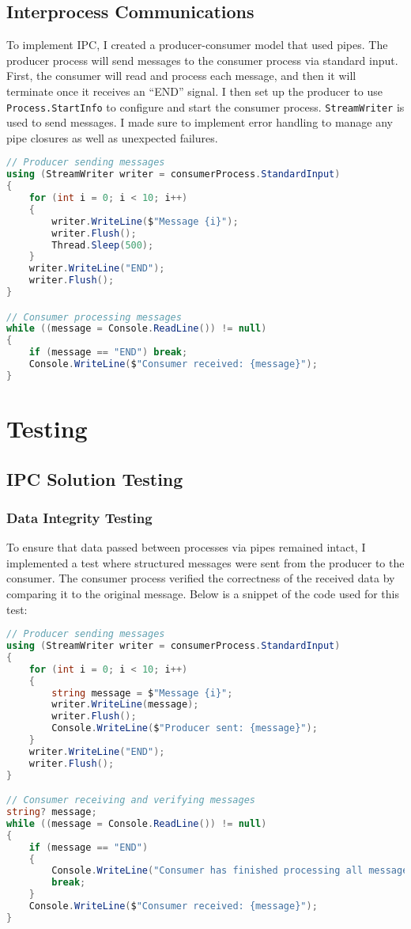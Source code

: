 \documentclass{article}
\begin{document}
\subsection*{Interprocess Communications}

To implement IPC, I created a producer-consumer model that used pipes. The producer process will send messages to the consumer process via standard input. First, the consumer will read and process each message, and then it will terminate once it receives an “END” signal. I then set up the producer to use \texttt{Process.StartInfo} to configure and start the consumer process. \texttt{StreamWriter} is used to send messages. I made sure to implement error handling to manage any pipe closures as well as unexpected failures.

\begin{lstlisting}[language=C#]
// Producer sending messages
using (StreamWriter writer = consumerProcess.StandardInput)
{
    for (int i = 0; i < 10; i++)
    {
        writer.WriteLine($"Message {i}");
        writer.Flush();
        Thread.Sleep(500);
    }
    writer.WriteLine("END");
    writer.Flush();
}

// Consumer processing messages
while ((message = Console.ReadLine()) != null)
{
    if (message == "END") break;
    Console.WriteLine($"Consumer received: {message}");
}
\end{lstlisting}

\section*{Testing}

\subsection*{IPC Solution Testing}

\subsubsection*{Data Integrity Testing}
To ensure that data passed between processes via pipes remained intact, I implemented a test where structured messages were sent from the producer to the consumer. The consumer process verified the correctness of the received data by comparing it to the original message. Below is a snippet of the code used for this test:

\begin{lstlisting}[language=C#]
// Producer sending messages
using (StreamWriter writer = consumerProcess.StandardInput)
{
    for (int i = 0; i < 10; i++)
    {
        string message = $"Message {i}";
        writer.WriteLine(message);
        writer.Flush();
        Console.WriteLine($"Producer sent: {message}");
    }
    writer.WriteLine("END");
    writer.Flush();
}

// Consumer receiving and verifying messages
string? message;
while ((message = Console.ReadLine()) != null)
{
    if (message == "END")
    {
        Console.WriteLine("Consumer has finished processing all messages.");
        break;
    }
    Console.WriteLine($"Consumer received: {message}");
}
\end{lstlisting}
\end{document}
